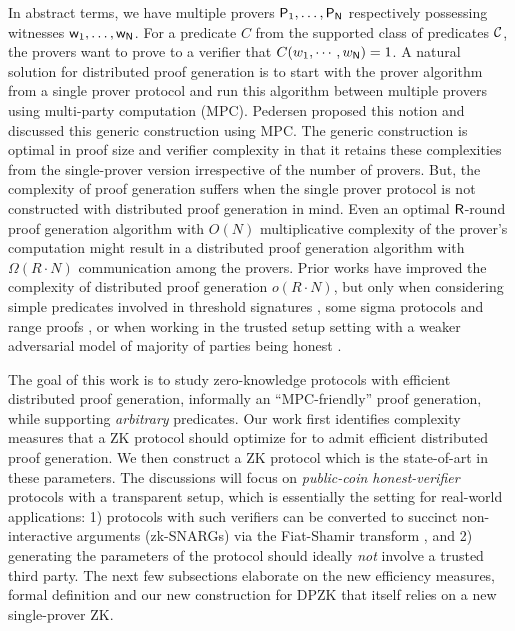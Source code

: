 In abstract terms, we have multiple provers $\mathsf{P}_1, \ldots, \mathsf{P}_{\mathsf{N}}$ respectively possessing witnesses $\mathsf{w}_1, \ldots, \mathsf{w}_{\mathsf{N}}$. For a predicate $C$ from the supported class of predicates ${\mathcal{C}}$, the provers want to prove to a verifier that $C(w_1,\cdots,w_{\mathsf{N}}) = 1$.
A natural solution for distributed proof generation is to start with the prover algorithm from a single prover protocol and run this algorithm between multiple provers using multi-party computation (MPC). Pedersen \cite{Ped92} proposed this notion and discussed this generic construction using MPC.
The generic construction is optimal in proof size and verifier complexity in that it retains these complexities from the single-prover version irrespective of the number of provers. But, the complexity of proof generation suffers when the single prover protocol is not constructed with distributed proof generation in mind. Even an optimal $\mathsf{R}$-round proof generation algorithm with $O(N)$ multiplicative complexity of the prover's computation might result in a distributed proof generation algorithm with $\Omega(R \cdot N)$ communication among the provers.
Prior works have improved the complexity of distributed proof generation $o(R \cdot N)$, but only when considering simple predicates involved in threshold signatures \cite{DDS}, some sigma protocols \cite{EfficientTZ} and range proofs \cite{bulletproofs}, or when working in the trusted setup setting with a weaker adversarial model of majority of parties being honest \cite{trinocchio}.

The goal of this work is to study zero-knowledge protocols with efficient distributed proof generation, informally an ``MPC-friendly'' proof generation, while supporting \textit{arbitrary} predicates. %
Our work first identifies complexity measures that a ZK protocol should optimize for to admit efficient distributed proof generation. We then construct a ZK protocol which is the state-of-art in these parameters. The discussions will focus on {\em public-coin honest-verifier} protocols with a transparent setup, which is essentially the setting for real-world applications: 1) protocols with such verifiers can be converted to succinct non-interactive  arguments (zk-SNARGs)  via the Fiat-Shamir transform \cite{FS86, BCS16}, and  2) generating the parameters of the protocol should ideally {\em not} involve a trusted third party. The next few subsections elaborate on the new efficiency measures, formal definition and our new construction for DPZK that itself relies on a new single-prover ZK.

